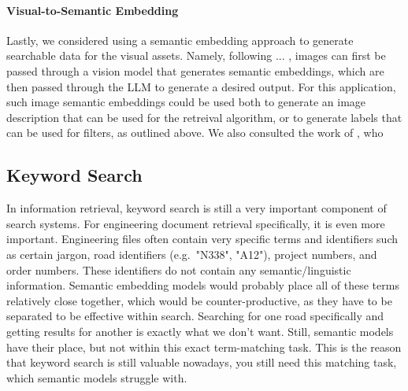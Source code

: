 

\paragraph{Visual-to-Semantic Embedding} Lastly, we considered using a semantic embedding approach to generate searchable data for the visual assets.
Namely, following ... , images can first be passed through a vision model that generates semantic embeddings, which are then passed through the LLM to generate a desired output.
For this application, such image semantic embeddings could be used both to generate an image description that can be used for the retreival algorithm, or to generate labels that can be used for filters, as outlined above.
We also consulted the work of \cite{gobels2024towards}, who 

\subsection{Keyword Search}
In information retrieval, keyword search is still a very important component of search systems. For engineering document retrieval specifically, it is even more important. Engineering files often contain very specific terms and identifiers such as certain jargon, road identifiers (e.g.\ "N338", "A12"), project numbers, and order numbers. These identifiers do not contain any semantic/linguistic information. Semantic embedding models would probably place all of these terms relatively close together, which would be counter-productive, as they have to be separated to be effective within search. Searching for one road specifically and getting results for another is exactly what we don't want. Still, semantic models have their place, but not within this exact term-matching task. This is the reason that keyword search is still valuable nowadays, you still need this matching task, which semantic models struggle with.

